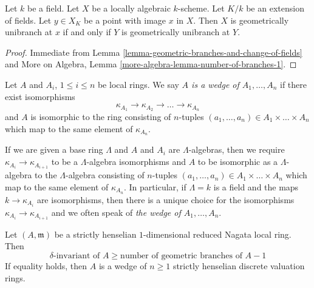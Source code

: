\begin{lemma}
\label{lemma-geometrically-unibranch-and-change-of-fields}
Let $k$ be a field. Let $X$ be a locally algebraic $k$-scheme.
Let $K/k$ be an extension of fields. Let $y \in X_K$ be a
point with image $x$ in $X$. Then $X$ is geometrically unibranch
at $x$ if and only if $Y$ is geometrically unibranch at $Y$.
\end{lemma}

\begin{proof}
Immediate from
Lemma \ref{lemma-geometric-branches-and-change-of-fields}
and More on Algebra, Lemma \ref{more-algebra-lemma-number-of-branches-1}.
\end{proof}

\begin{definition}
\label{definition-wedge}
Let $A$ and $A_i$, $1 \leq i \leq n$ be local rings. We say
{\it $A$ is a wedge of $A_1, \ldots, A_n$}
if there exist isomorphisms
$$
\kappa_{A_1} \to \kappa_{A_2} \to \ldots \to \kappa_{A_n}
$$
and $A$ is isomorphic to the ring consisting of $n$-tuples
$(a_1, \ldots, a_n) \in A_1 \times \ldots \times A_n$ which map to the
same element of $\kappa_{A_n}$.
\end{definition}

\noindent
If we are given a base ring $\Lambda$ and $A$ and $A_i$ are $\Lambda$-algebras,
then we require $\kappa_{A_i} \to \kappa_{A_{i + 1}}$
to be a $\Lambda$-algebra isomorphisms
and $A$ to be isomorphic as a $\Lambda$-algebra to the $\Lambda$-algebra
consisting  of $n$-tuples
$(a_1, \ldots, a_n) \in A_1 \times \ldots \times A_n$ which map to the
same element of $\kappa_{A_n}$. In particular, if $\Lambda = k$ is a field
and the maps $k \to \kappa_{A_i}$ are isomorphisms, then
there is a unique choice for the isomorphisms
$\kappa_{A_i} \to \kappa_{A_{i + 1}}$ and
we often speak of {\it the wedge of $A_1, \ldots, A_n$}.

\begin{lemma}
\label{lemma-delta-number-branches-inequality-sh}
Let $(A, \mathfrak m)$ be a strictly henselian
$1$-dimensional reduced Nagata local ring. Then
$$
\delta\text{-invariant of }A \geq \text{number of geometric branches of }A - 1
$$
If equality holds, then $A$ is a wedge of $n \geq 1$ strictly henselian
discrete valuation rings.
\end{lemma}

